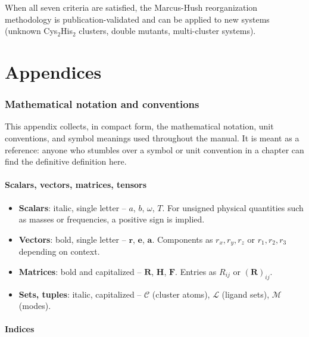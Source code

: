 \documentclass[11pt,a4paper,twoside]{article}
\theoremstyle{remark}
\begin{document}
When all seven criteria are satisfied, the Marcus-Hush
reorganization methodology is publication-validated and can be
applied to new systems (unknown Cys$_2$His$_2$ clusters, double
mutants, multi-cluster systems).

\appendix

\part{Appendices}

\section{Mathematical notation and conventions}
\label{app:notation}

This appendix collects, in compact form, the mathematical
notation, unit conventions, and symbol meanings used throughout
the manual. It is meant as a reference: anyone who stumbles over a
symbol or unit convention in a chapter can find the definitive
definition here.

\subsection{Scalars, vectors, matrices, tensors}

\begin{itemize}\setlength{\itemsep}{2pt}
  \item \textbf{Scalars}: italic, single letter -- $a$, $b$,
        $\omega$, $T$. For unsigned physical quantities such as
        masses or frequencies, a positive sign is implied.
  \item \textbf{Vectors}: bold, single letter -- $\mathbf{r}$,
        $\mathbf{e}$, $\mathbf{a}$. Components as
        $r_x, r_y, r_z$ or $r_1, r_2, r_3$ depending on context.
  \item \textbf{Matrices}: bold and capitalized -- $\mathbf{R}$,
        $\mathbf{H}$, $\mathbf{F}$. Entries as $R_{ij}$ or
        $(\mathbf{R})_{ij}$.
  \item \textbf{Sets, tuples}: italic, capitalized --
        $\mathcal{C}$ (cluster atoms), $\mathcal{L}$
        (ligand sets), $\mathcal{M}$ (modes).
\end{itemize}

\subsection{Indices}
\end{document}

